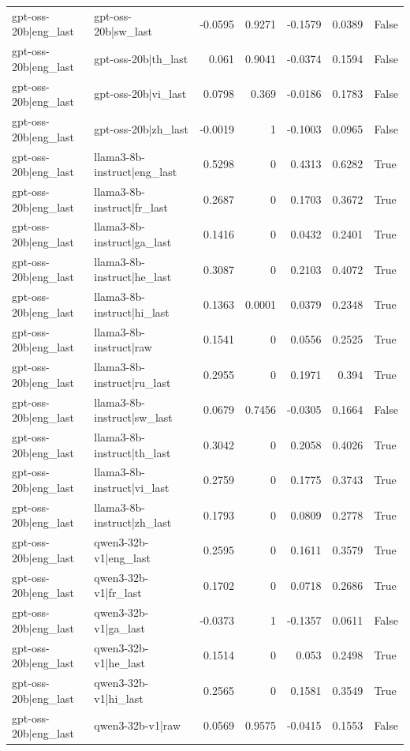 \begin{table}
\begin{tabular}{l l r r r r l}
gpt-oss-20b|eng_last & gpt-oss-20b|sw_last & -0.0595 & 0.9271 & -0.1579 & 0.0389 & False \\
gpt-oss-20b|eng_last & gpt-oss-20b|th_last & 0.061 & 0.9041 & -0.0374 & 0.1594 & False \\
gpt-oss-20b|eng_last & gpt-oss-20b|vi_last & 0.0798 & 0.369 & -0.0186 & 0.1783 & False \\
gpt-oss-20b|eng_last & gpt-oss-20b|zh_last & -0.0019 & 1 & -0.1003 & 0.0965 & False \\
gpt-oss-20b|eng_last & llama3-8b-instruct|eng_last & 0.5298 & 0 & 0.4313 & 0.6282 & True \\
gpt-oss-20b|eng_last & llama3-8b-instruct|fr_last & 0.2687 & 0 & 0.1703 & 0.3672 & True \\
gpt-oss-20b|eng_last & llama3-8b-instruct|ga_last & 0.1416 & 0 & 0.0432 & 0.2401 & True \\
gpt-oss-20b|eng_last & llama3-8b-instruct|he_last & 0.3087 & 0 & 0.2103 & 0.4072 & True \\
gpt-oss-20b|eng_last & llama3-8b-instruct|hi_last & 0.1363 & 0.0001 & 0.0379 & 0.2348 & True \\
gpt-oss-20b|eng_last & llama3-8b-instruct|raw & 0.1541 & 0 & 0.0556 & 0.2525 & True \\
gpt-oss-20b|eng_last & llama3-8b-instruct|ru_last & 0.2955 & 0 & 0.1971 & 0.394 & True \\
gpt-oss-20b|eng_last & llama3-8b-instruct|sw_last & 0.0679 & 0.7456 & -0.0305 & 0.1664 & False \\
gpt-oss-20b|eng_last & llama3-8b-instruct|th_last & 0.3042 & 0 & 0.2058 & 0.4026 & True \\
gpt-oss-20b|eng_last & llama3-8b-instruct|vi_last & 0.2759 & 0 & 0.1775 & 0.3743 & True \\
gpt-oss-20b|eng_last & llama3-8b-instruct|zh_last & 0.1793 & 0 & 0.0809 & 0.2778 & True \\
gpt-oss-20b|eng_last & qwen3-32b-v1|eng_last & 0.2595 & 0 & 0.1611 & 0.3579 & True \\
gpt-oss-20b|eng_last & qwen3-32b-v1|fr_last & 0.1702 & 0 & 0.0718 & 0.2686 & True \\
gpt-oss-20b|eng_last & qwen3-32b-v1|ga_last & -0.0373 & 1 & -0.1357 & 0.0611 & False \\
gpt-oss-20b|eng_last & qwen3-32b-v1|he_last & 0.1514 & 0 & 0.053 & 0.2498 & True \\
gpt-oss-20b|eng_last & qwen3-32b-v1|hi_last & 0.2565 & 0 & 0.1581 & 0.3549 & True \\
gpt-oss-20b|eng_last & qwen3-32b-v1|raw & 0.0569 & 0.9575 & -0.0415 & 0.1553 & False \\

\end{tabular}
\end{table}
